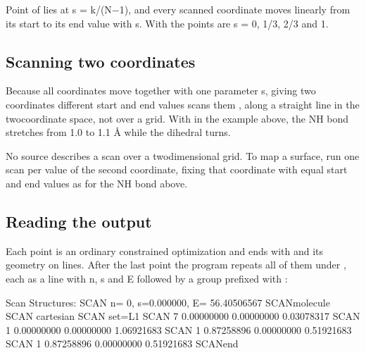 \documentclass[letterpaper,10pt,english,openany,oneside]{sphinxmanual}
\begin{document}
\sphinxAtStartPar
Point  of  lies at s = k/(N−1), and every scanned coordinate moves linearly from its start to its end value
with s. With  the points are s = 0, 1/3, 2/3 and 1.




\subsection{Scanning two coordinates}
\label{\detokenize{tasks/ts-irc-scan:scanning-two-coordinates}}
\sphinxAtStartPar
Because all coordinates move together with one parameter s, giving two coordinates different start and end values
scans them , along a straight line in the two\sphinxhyphen{}coordinate space, not over a grid. With
 in the example above, the N\textendash{}H bond stretches from 1.0 to 1.1 Å while the dihedral turns.



\sphinxAtStartPar
No source describes a scan over a two\sphinxhyphen{}dimensional grid. To map a surface, run one scan per value of the second coordinate,
fixing that coordinate with equal start and end values as for the N\textendash{}H bond above.




\subsection{Reading the output}
\label{\detokenize{tasks/ts-irc-scan:reading-the-output}}
\sphinxAtStartPar
Each point is an ordinary constrained optimization and ends with  and its
geometry on  lines. After the last point the program repeats all of them under , each as a
line with n, s and E followed by a  group prefixed with :

\begin{sphinxVerbatim}[commandchars=\\\{\}]
 Scan Structures:
SCAN\PYGZgt{} n= 0, s=0.000000, E=   \PYGZhy{}56.40506567
SCAN\PYGZgt{}\PYGZdl{}molecule
SCAN\PYGZgt{} cartesian
SCAN\PYGZgt{} set=L1
SCAN\PYGZgt{}   7     0.00000000  \PYGZhy{}0.00000000  \PYGZhy{}0.03078317
SCAN\PYGZgt{}   1    \PYGZhy{}0.00000000   0.00000000   1.06921683
SCAN\PYGZgt{}   1     0.87258896  \PYGZhy{}0.00000000  \PYGZhy{}0.51921683
SCAN\PYGZgt{}   1    \PYGZhy{}0.87258896  \PYGZhy{}0.00000000  \PYGZhy{}0.51921683
SCAN\PYGZgt{}\PYGZdl{}end
\end{sphinxVerbatim}
\end{document}
